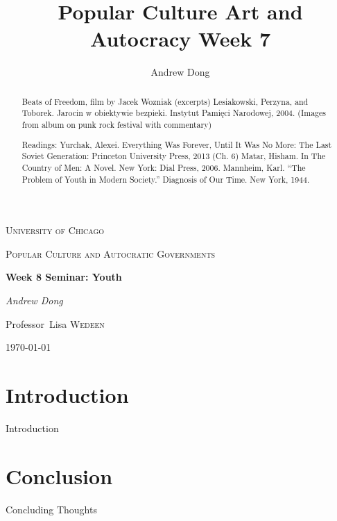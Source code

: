 \documentclass{article}
\begin{document}
\begin{titlepage}
	\centering
	{\scshape\LARGE University of Chicago \par}
	\vspace{1cm}
	{\scshape\Large Popular Culture and Autocratic Governments\par}
	\vspace{1.5cm}
	{\huge\bfseries Week 8 Seminar: Youth \par}
	\vspace{1cm}
	{\Large\itshape Andrew Dong\par}
	\vspace{2cm}
	
	\vfill


\begin{abstract}
Beats of Freedom, film by Jacek Wozniak (excerpts) 
Lesiakowski, Perzyna, and Toborek. Jarocin w obiektywie bezpieki. Instytut Pamięci Narodowej, 2004. (Images from album on punk rock festival with commentary)  


Readings:
Yurchak, Alexei. Everything Was Forever, Until It Was No More: The Last Soviet Generation: Princeton University Press, 2013 (Ch. 6) 
Matar, Hisham. In The Country of Men: A Novel. New York: Dial Press, 2006. 
Mannheim, Karl. “The Problem of Youth in Modern Society.” Diagnosis of Our Time. New York, 1944. 
\end{abstract}

\vfill

	Professor~Lisa \textsc{Wedeen}
	\vspace{5 mm}
	\\{\large \today\par}
\end{titlepage}

\title{Popular Culture Art and Autocracy Week 7}
\author{Andrew Dong}

\maketitle


\section{Introduction}

Introduction




\section{Conclusion}

Concluding Thoughts
\end{document}
